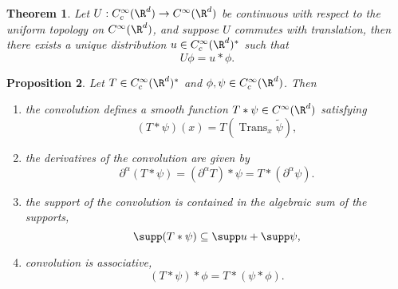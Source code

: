 \documentclass[reqno]{amsart}
\newtheorem{theorem}{Theorem}
\newtheorem{proposition}[theorem]{Proposition}
\theoremstyle{definition}
\theoremstyle{remark}
\begin{document}
\begin{theorem}
	Let $U : C^\infty_c (\R^d) \to C^\infty (\R^d)$ be continuous with respect to the uniform topology on $C^\infty (\R^d)$, and suppose $U$ commutes with translation, then there exists a unique distribution $u \in C^\infty_c (\R^d)^*$ such that 
		\[ U \phi = u * \phi.  \]
\end{theorem}

\begin{proposition}
	Let $T \in C^\infty_c (\R^d)^*$ and $\phi, \psi \in C^\infty_c (\R^d)$. Then 
	\begin{enumerate}
		\item the convolution defines a smooth function $T * \psi \in C^\infty (\R^d)$ satisfying
					\[ (T * \psi)(x) = T(\operatorname{Trans}_x \tilde \psi), \]
		\item the derivatives of the convolution are given by 
					\[ \partial^\alpha (T * \psi) = (\partial^\alpha T) * \psi = T * (\partial^\alpha \psi). \]
		\item the support of the convolution is contained in the algebraic sum of the supports, 
					\[ \supp (T * \psi) \subseteq \supp u + \supp \psi,  \]
		\item convolution is associative, 
					\[ (T * \psi) * \phi = T * (\psi * \phi). \]			
	\end{enumerate}
\end{proposition}
\end{document}
